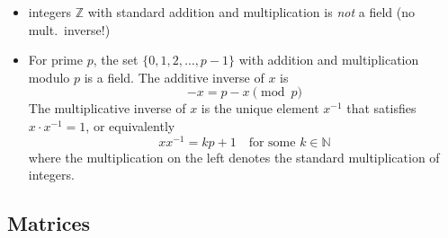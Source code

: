 \documentclass[11pt,twoside]{report}
\newcommand{\bbN}{{\mathbb{N}}}
\newcommand{\bbZ}{{\mathbb{Z}}}
\begin{document}
\begin{itemize}
\begin{itemize}
\item integers $\bbZ$ with standard addition and multiplication is \emph{not} a field (no mult.\ inverse!) 


\item For prime $p$, the set $\{ 0, 1, 2, \dots, p-1\}$ with addition and multiplication modulo $p$ is a field. The additive inverse of $x$ is 
\[
-x = p -x \pmod{p} 
\]
The multiplicative inverse  of $x$ is the unique element $x^{-1}$ that satisfies  $x \cdot x^{-1} = 1$, or equivalently 
\[
x  x^{-1}  =  k p + 1 \quad \text{for some $k \in \bbN$}
\]
where the multiplication on the left denotes the standard multiplication of integers. 

\end{itemize}

\end{itemize}


  \subsection{Matrices} 
  
\end{document}
